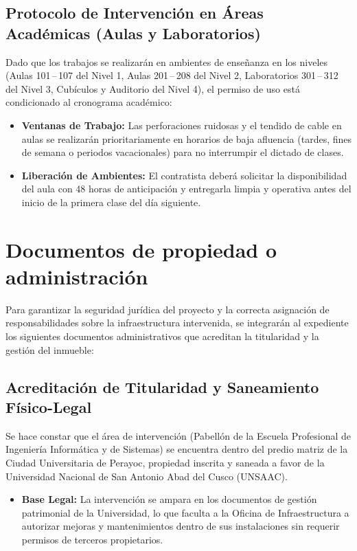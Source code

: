 \subsection*{Protocolo de Intervención en Áreas Académicas (Aulas y Laboratorios)}

Dado que los trabajos se realizarán en ambientes de enseñanza en los \totalPisos{} niveles (Aulas 101\,--\,107 del Nivel 1, Aulas 201\,--\,208 del Nivel 2, Laboratorios 301\,--\,312 del Nivel 3, Cubículos y Auditorio del Nivel 4), el permiso de uso está condicionado al cronograma académico:

\begin{itemize}
    \item \textbf{Ventanas de Trabajo:} Las perforaciones ruidosas y el tendido de cable en aulas se realizarán prioritariamente en horarios de baja afluencia (tardes, fines de semana o periodos vacacionales) para no interrumpir el dictado de clases.
    \item \textbf{Liberación de Ambientes:} El contratista deberá solicitar la disponibilidad del aula con 48 horas de anticipación y entregarla limpia y operativa antes del inicio de la primera clase del día siguiente.
\end{itemize}

\section{Documentos de propiedad o administración}

Para garantizar la seguridad jurídica del proyecto y la correcta asignación de responsabilidades sobre la infraestructura intervenida, se integrarán al expediente los siguientes documentos administrativos que acreditan la titularidad y la gestión del inmueble:

\subsection*{Acreditación de Titularidad y Saneamiento Físico-Legal}

Se hace constar que el área de intervención (Pabellón de la Escuela Profesional de Ingeniería Informática y de Sistemas) se encuentra dentro del predio matriz de la Ciudad Universitaria de Perayoc, propiedad inscrita y saneada a favor de la Universidad Nacional de San Antonio Abad del Cusco (UNSAAC).

\begin{itemize}
    \item \textbf{Base Legal:} La intervención se ampara en los documentos de gestión patrimonial de la Universidad, lo que faculta a la Oficina de Infraestructura a autorizar mejoras y mantenimientos dentro de sus instalaciones sin requerir permisos de terceros propietarios.
\end{itemize}

